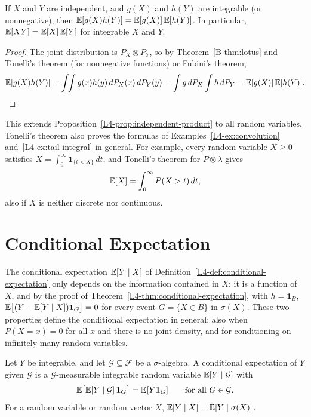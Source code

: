 \begin{proposition}\label{B-prop:independent-product}
    If $X$ and $Y$ are independent, and $g(X)$ and $h(Y)$ are integrable (or nonnegative), then $\mathbb{E}[g(X)h(Y)] = \mathbb{E}[g(X)]\,\mathbb{E}[h(Y)]$. In particular, $\mathbb{E}[XY] = \mathbb{E}[X]\,\mathbb{E}[Y]$ for integrable $X$ and $Y$.
\end{proposition}

\begin{proof}
    The joint distribution is $P_X \otimes P_Y$, so by Theorem~\ref{B-thm:lotus} and Tonelli's theorem (for nonnegative functions) or Fubini's theorem,
    \[\mathbb{E}[g(X)h(Y)] = \int\!\!\int g(x)h(y)\, dP_X(x)\, dP_Y(y) = \int g\, dP_X\int h\, dP_Y = \mathbb{E}[g(X)]\,\mathbb{E}[h(Y)]. \qedhere\]
\end{proof}

This extends Proposition~\ref{L4-prop:independent-product} to all random variables. Tonelli's theorem also proves the formulas of Examples~\ref{L4-ex:convolution} and~\ref{L4-ex:tail-integral} in general. For example, every random variable $X \geq 0$ satisfies $X = \int_0^\infty \mathbf{1}_{\{t < X\}}\, dt$, and Tonelli's theorem for $P \otimes \lambda$ gives
\[\mathbb{E}[X] = \int_0^\infty P(X > t)\, dt,\]
also if $X$ is neither discrete nor continuous.

\section{Conditional Expectation}\label{B-sec:conditional-expectation}

The conditional expectation $\mathbb{E}[Y \mid X]$ of Definition~\ref{L4-def:conditional-expectation} only depends on the information contained in $X$: it is a function of $X$, and by the proof of Theorem~\ref{L4-thm:conditional-expectation}, with $h = \mathbf{1}_B$, $\mathbb{E}\big[(Y - \mathbb{E}[Y \mid X])\mathbf{1}_G\big] = 0$ for every event $G = \{X \in B\}$ in $\sigma(X)$. These two properties define the conditional expectation in general: also when $P(X = x) = 0$ for all $x$ and there is no joint density, and for conditioning on infinitely many random variables.

\begin{definition}\label{B-def:conditional-expectation-general}
    Let $Y$ be integrable, and let $\mathcal{G} \subseteq \mathcal{F}$ be a $\sigma$-algebra. A conditional expectation of $Y$ given $\mathcal{G}$ is a $\mathcal{G}$-measurable integrable random variable $\mathbb{E}[Y \mid \mathcal{G}]$ with
    \[\mathbb{E}\big[\mathbb{E}[Y \mid \mathcal{G}]\,\mathbf{1}_G\big] = \mathbb{E}[Y\mathbf{1}_G] \qquad \text{for all } G \in \mathcal{G}.\]
    For a random variable or random vector $X$, $\mathbb{E}[Y \mid X] = \mathbb{E}[Y \mid \sigma(X)]$.
\end{definition}

